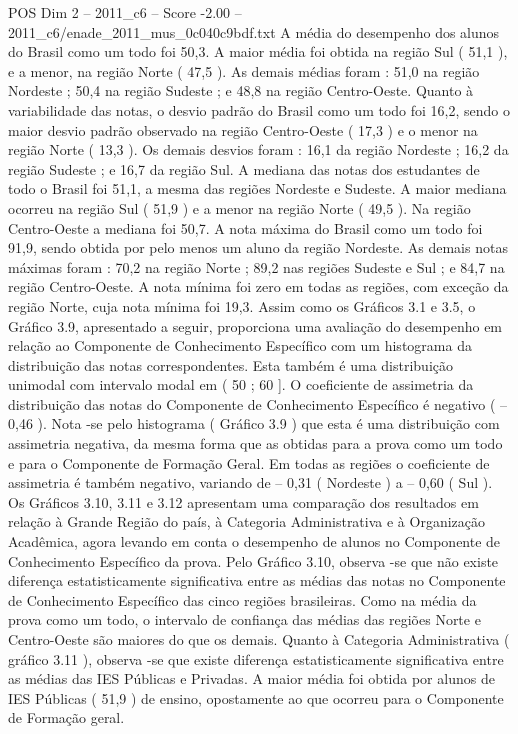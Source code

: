 \begin{textsample}{POS Dim 2 – 2011\_c6 – Score -2.00 – 2011\_c6/enade\_2011\_mus\_0c040c9bdf.txt}
A média do desempenho dos alunos do Brasil como um todo foi 50,3.
A maior média foi obtida na região Sul ( 51,1 ), e a menor, na região Norte ( 47,5 ).
As demais médias foram : 51,0 na região Nordeste ; 50,4 na região Sudeste ; e 48,8 na região Centro-Oeste.
Quanto à variabilidade das notas, o desvio padrão do Brasil como um todo foi 16,2, sendo o maior desvio padrão observado na região Centro-Oeste ( 17,3 ) e o menor na região Norte ( 13,3 ).
Os demais desvios foram : 16,1 da região Nordeste ; 16,2 da região Sudeste ; e 16,7 da região Sul.
A mediana das notas dos estudantes de todo o Brasil foi 51,1, a mesma das regiões Nordeste e Sudeste.
A maior mediana ocorreu na região Sul ( 51,9 ) e a menor na região Norte ( 49,5 ).
Na região Centro-Oeste a mediana foi 50,7.
A nota máxima do Brasil como um todo foi 91,9, sendo obtida por pelo menos um aluno da região Nordeste.
As demais notas máximas foram : 70,2 na região Norte ; 89,2 nas regiões Sudeste e Sul ; e 84,7 na região Centro-Oeste.
A nota mínima foi zero em todas as regiões, com exceção da região Norte, cuja nota mínima foi 19,3.
Assim como os Gráficos 3.1 e 3.5, o Gráfico 3.9, apresentado a seguir, proporciona uma avaliação do desempenho em relação ao Componente de Conhecimento Específico com um histograma da distribuição das notas correspondentes.
Esta também é uma distribuição unimodal com intervalo modal em ( 50 ; 60 ].
O coeficiente de assimetria da distribuição das notas do Componente de Conhecimento Específico é negativo ( – 0,46 ).
Nota -se pelo histograma ( Gráfico 3.9 ) que esta é uma distribuição com assimetria negativa, da mesma forma que as obtidas para a prova como um todo e para o Componente de Formação Geral.
Em todas as regiões o coeficiente de assimetria é também negativo, variando de – 0,31 ( Nordeste ) a – 0,60 ( Sul ).
Os Gráficos 3.10, 3.11 e 3.12 apresentam uma comparação dos resultados em relação à Grande Região do país, à Categoria Administrativa e à Organização Acadêmica, agora levando em conta o desempenho de alunos no Componente de Conhecimento Específico da prova.
Pelo Gráfico 3.10, observa -se que não existe diferença estatisticamente significativa entre as médias das notas no Componente de Conhecimento Específico das cinco regiões brasileiras.
Como na média da prova como um todo, o intervalo de confiança das médias das regiões Norte e Centro-Oeste são maiores do que os demais.
Quanto à Categoria Administrativa ( gráfico 3.11 ), observa -se que existe diferença estatisticamente significativa entre as médias das IES Públicas e Privadas.
A maior média foi obtida por alunos de IES Públicas ( 51,9 ) de ensino, opostamente ao que ocorreu para o Componente de Formação geral.

\end{textsample}
